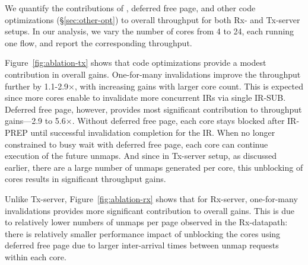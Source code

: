 We quantify the contributions of 
\optOne{}, deferred free page,
and other {\name} code optimizations (\S\ref{sec:other-opt}) to overall throughput for both Rx- and Tx-server setups.
In our analysis, we vary the number of cores from 4 to 24, 
    each running one flow, and report the corresponding throughput.

 Figure~\ref{fig:ablation-tx} shows that code optimizations provide a modest contribution in overall gains. One-for-many invalidations improve the throughput further by {1.1-2.9$\times$}, with increasing gains with larger core count. This is expected since more cores enable {\name} to invalidate more concurrent IRs via single IR-SUB. Deferred free page, however, provides most significant contribution to throughput gains---{2.9 to 5.6$\times$}. Without deferred free page, each core stays blocked after IR-PREP until successful invalidation completion for the IR. When no longer constrained to busy wait with deferred free page, each core can continue execution of the future unmaps. And since in Tx-server setup, as discussed earlier, there are a large number of unmaps generated per core, this unblocking of cores results in significant throughput gains. 





Unlike Tx-server, Figure~\ref{fig:ablation-rx} shows that for Rx-server, one-for-many invalidations provides more significant contribution to overall gains. This is due to relatively lower numbers of unmaps per page observed in the Rx-datapath: there is relatively smaller performance impact of unblocking the cores using deferred free page due to larger inter-arrival times between unmap requests within each core. 


